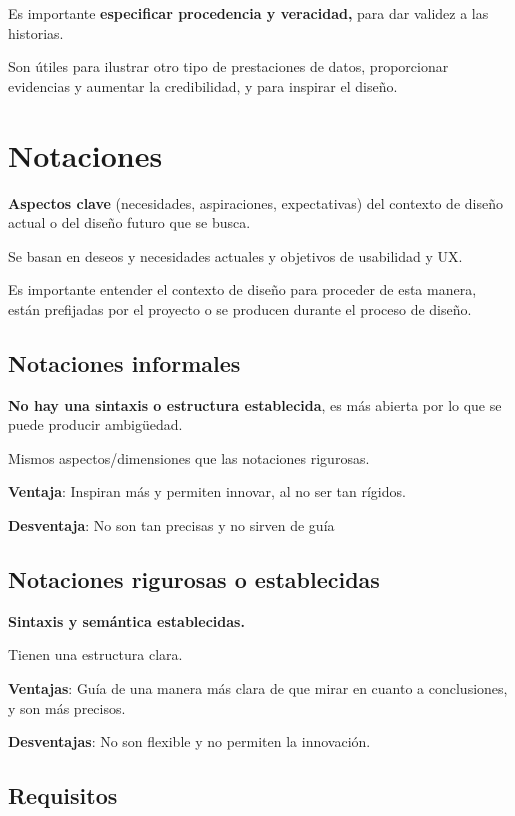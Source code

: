 \documentclass[12pt, twoside, openright]{report} %
\begin{document}
Es importante \textbf{especificar procedencia y veracidad,} para dar
validez a las historias.

Son útiles para ilustrar otro tipo de prestaciones de datos,
proporcionar evidencias y aumentar la credibilidad, y para inspirar el
diseño.

\section{Notaciones}

\textbf{Aspectos clave} (necesidades, aspiraciones, expectativas) del
contexto de diseño actual o del diseño futuro que se busca.

Se basan en deseos y necesidades actuales y objetivos de usabilidad y
UX.

Es importante entender el contexto de diseño para proceder de esta
manera, están prefijadas por el proyecto o se producen durante el
proceso de diseño.

\subsection{Notaciones informales}

\textbf{No hay una sintaxis o estructura establecida}, es más abierta
por lo que se puede producir ambigüedad.

Mismos aspectos/dimensiones que las notaciones rigurosas.

\textbf{Ventaja}: Inspiran más y permiten innovar, al no ser tan
rígidos.

\textbf{Desventaja}: No son tan precisas y no sirven de guía

\subsection{Notaciones rigurosas o establecidas}

\textbf{Sintaxis y semántica establecidas.}

Tienen una estructura clara.

\textbf{Ventajas}: Guía de una manera más clara de que mirar en cuanto a
conclusiones, y son más precisos.

\textbf{Desventajas}: No son flexible y no permiten la innovación.

\subsection{Requisitos}
\end{document}
